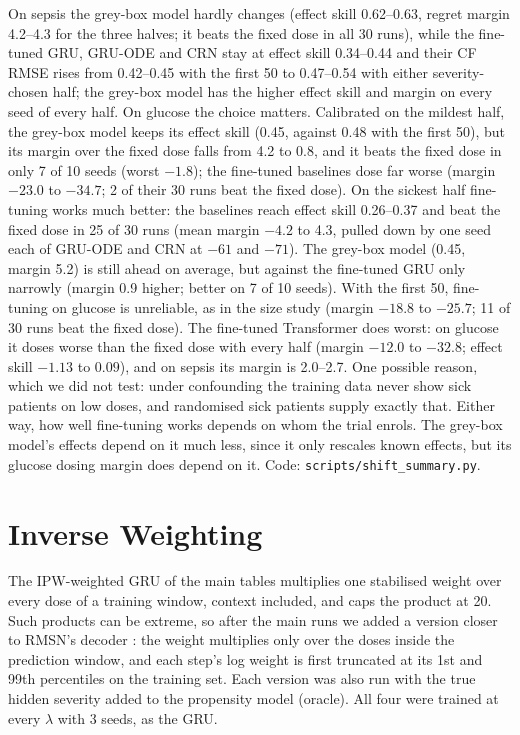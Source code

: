 \documentclass[letterpaper]{article}
\begin{document}
On sepsis the grey-box model hardly changes (effect skill 0.62--0.63, regret margin 4.2--4.3 for the three halves; it beats the fixed dose in all 30 runs), while the fine-tuned GRU, GRU-ODE and CRN stay at effect skill 0.34--0.44 and their CF RMSE rises from 0.42--0.45 with the first 50 to 0.47--0.54 with either severity-chosen half; the grey-box model has the higher effect skill and margin on every seed of every half. On glucose the choice matters. Calibrated on the mildest half, the grey-box model keeps its effect skill (0.45, against 0.48 with the first 50), but its margin over the fixed dose falls from 4.2 to 0.8, and it beats the fixed dose in only 7 of 10 seeds (worst $-1.8$); the fine-tuned baselines dose far worse (margin $-23.0$ to $-34.7$; 2 of their 30 runs beat the fixed dose). On the sickest half fine-tuning works much better: the baselines reach effect skill 0.26--0.37 and beat the fixed dose in 25 of 30 runs (mean margin $-4.2$ to 4.3, pulled down by one seed each of GRU-ODE and CRN at $-61$ and $-71$). The grey-box model (0.45, margin 5.2) is still ahead on average, but against the fine-tuned GRU only narrowly (margin 0.9 higher; better on 7 of 10 seeds). With the first 50, fine-tuning on glucose is unreliable, as in the size study (margin $-18.8$ to $-25.7$; 11 of 30 runs beat the fixed dose). The fine-tuned Transformer does worst: on glucose it doses worse than the fixed dose with every half (margin $-12.0$ to $-32.8$; effect skill $-1.13$ to $0.09$), and on sepsis its margin is 2.0--2.7. One possible reason, which we did not test: under confounding the training data never show sick patients on low doses, and randomised sick patients supply exactly that. Either way, how well fine-tuning works depends on whom the trial enrols. The grey-box model's effects depend on it much less, since it only rescales known effects, but its glucose dosing margin does depend on it. Code: \texttt{scripts/shift\_summary.py}.

\section{Inverse Weighting}
\label{sec:ipw}

The IPW-weighted GRU of the main tables multiplies one stabilised weight over every dose of a training window, context included, and caps the product at 20. Such products can be extreme, so after the main runs we added a version closer to RMSN's decoder \citep{lim2018rmsn}: the weight multiplies only over the doses inside the prediction window, and each step's log weight is first truncated at its 1st and 99th percentiles on the training set. Each version was also run with the true hidden severity added to the propensity model (oracle). All four were trained at every $\lambda$ with 3 seeds, as the GRU.
\end{document}
